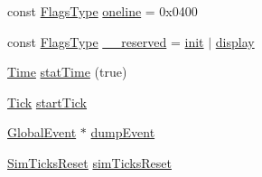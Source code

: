 \begin{DoxyCompactItemize}
\item 
const \hyperlink{namespaceStats_ac52f827dcfea58febdc3860fd610dc09}{FlagsType} \hyperlink{namespaceStats_a924518f4adce022c20ffa8ae5540e6d4}{oneline} = 0x0400
\item 
const \hyperlink{namespaceStats_ac52f827dcfea58febdc3860fd610dc09}{FlagsType} \hyperlink{namespaceStats_a18e4982df9983fc1af85ce62a8020c52}{\_\-\_\-reserved} = \hyperlink{namespaceStats_aa1f55d332b4c8393735b7f1d87098beb}{init} $|$ \hyperlink{namespaceStats_a4f0406c9859ba486a98825d53a233056}{display}
\item 
\hyperlink{classTime}{Time} \hyperlink{namespaceStats_aacdcbac18a97c205ab9858dbba859eb0}{statTime} (true)
\item 
\hyperlink{base_2types_8hh_a5c8ed81b7d238c9083e1037ba6d61643}{Tick} \hyperlink{namespaceStats_abb5b9a49cfd474709a39c1133a1cabba}{startTick}
\item 
\hyperlink{classGlobalEvent}{GlobalEvent} $\ast$ \hyperlink{namespaceStats_aa19087402d9c677e9af38e996e8fab55}{dumpEvent}
\item 
\hyperlink{structStats_1_1SimTicksReset}{SimTicksReset} \hyperlink{namespaceStats_a3862efc82a7c55339d294adab97b3350}{simTicksReset}
\end{DoxyCompactItemize}


